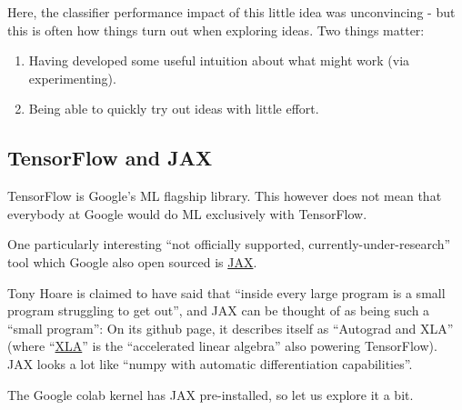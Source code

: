 \documentclass[11pt]{article}
\providecommand{\tightlist}{%
      \setlength{\itemsep}{0pt}\setlength{\parskip}{0pt}}
\begin{document}
    Here, the classifier performance impact of this little idea was
unconvincing - but this is often how things turn out when exploring
ideas. Two things matter:

\begin{enumerate}
\def\labelenumi{\arabic{enumi}.}
\tightlist
\item
  Having developed some useful intuition about what might work (via
  experimenting).
\item
  Being able to quickly try out ideas with little effort.
\end{enumerate}

    \hypertarget{tensorflow-and-jax}{%
\subsection{TensorFlow and JAX}\label{tensorflow-and-jax}}

TensorFlow is Google's ML flagship library. This however does not mean
that everybody at Google would do ML exclusively with TensorFlow.

One particularly interesting ``not officially supported,
currently-under-research'' tool which Google also open sourced is
\href{https://github.com/google/jax}{JAX}.

Tony Hoare is claimed to have said that ``inside every large program is
a small program struggling to get out'', and JAX can be thought of as
being such a ``small program'': On its github page, it describes itself
as ``Autograd and XLA'' (where
``\href{https://www.tensorflow.org/xla}{XLA}'' is the ``accelerated
linear algebra'' also powering TensorFlow). JAX looks a lot like ``numpy
with automatic differentiation capabilities''.

The Google colab kernel has JAX pre-installed, so let us explore it a
bit.
\end{document}
